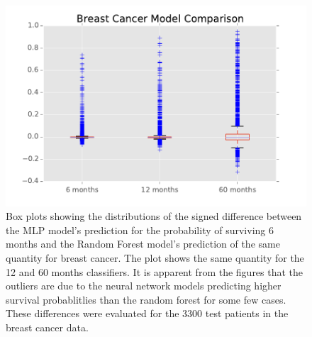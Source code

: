 \documentclass[10pt,letterpaper]{article}
\begin{document}
\begin{figure}[tbp]
\centering 
\begin{center}
\includegraphics[width=.70\textwidth,origin=c]{breastbox.pdf}
\caption{\label{fig:breastbox} Box plots showing the distributions of the signed difference between the MLP model's prediction for the probability of surviving 6 months and the Random Forest model's prediction of the same quantity for breast cancer. The plot shows the same quantity for the 12 and 60 months classifiers. It is apparent from the figures that the outliers are due to the neural network models predicting higher survival probablitlies than the random forest for some few cases. These differences were evaluated for the 3300 test patients in the breast cancer data.}
\end{center}
\end{figure}
\end{document}
